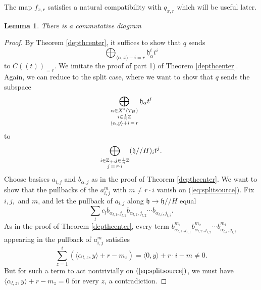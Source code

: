 \documentclass[12pt]{article}
\newtheorem{lemma}[theorem]{Lemma}
\theoremstyle{remark}
\begin{document}
The map $f_{x,r}$ satisfies a natural compatibility with $q_{x,r}$ which will be useful later.

\begin{lemma}\label{fqcompatibility}
There is a commutative diagram

\begin{center}
\end{center}
\end{lemma}

\begin{proof}
By Theorem \ref{depthcenter}, it suffices to show that $q$ sends
\[
\displaystyle\bigoplus_{\langle\alpha,x\rangle+i=r}\mathfrak{h}_{\alpha}^it^i
\]
to $C((t))_{=r}$. We imitate the proof of part 1) of Theorem \ref{depthcenter}. Again, we can reduce to the split case, where we want to show that $q$ sends the subspace
\begin{equation}\label{eq:splitsource}
\displaystyle\bigoplus_{\substack{\alpha\in X^*(T_H)\\ i\in\frac{1}{n}\mathbb{Z} \\ \langle\alpha,y\rangle+i\thinspace=\thinspace r}}\mathfrak{h}_{\alpha}t^i
\end{equation}
to
\[
\displaystyle\bigoplus_{\substack{i\in\mathbb{Z}_+,j\in\frac{1}{n}\mathbb{Z}\\ j\thinspace=\thinspace r\cdot i}}(\mathfrak{h}//H)_it^j.
\]
Choose basises $a_{i,j}$ and $b_{\alpha,j}$ as in the proof of Theorem \ref{depthcenter}. We want to show that the pullbacks of the $a_{i,j}^m$ with $m\neq r\cdot i$ vanish on (\ref{eq:splitsource}). Fix $i,j,$ and $m$, and let the pullback of $a_{i,j}$ along $\mathfrak{h}\rightarrow\mathfrak{h}//H$ equal
\[
\displaystyle\sum_{l}c_{l}b_{\alpha_{l,1},j_{l,1}}b_{\alpha_{l,2},j_{l,2}}\cdots b_{\alpha_{l,i},j_{l,i}}.
\]
As in the proof of Theorem \ref{depthcenter}, every term $b_{\alpha_{l,1},j_{l,1}}^{m_1}b_{\alpha_{l,2},j_{l,2}}^{m_2}\cdots b_{\alpha_{l,i},j_{l,i}}^{m_i}$ appearing in the pullback of $a_{i,j}^m$ satisfies
\[
\displaystyle\sum_{z=1}^i(\langle\alpha_{l,z},y\rangle+r-m_z)=\langle 0,y\rangle+r\cdot i-m \neq 0.
\]
But for such a term to act nontrivially on $(\ref{eq:splitsource})$, we must have $\langle\alpha_{l,z},y\rangle+r-m_z=0$ for every $z$, a contradiction.
\end{proof}
\end{document}
